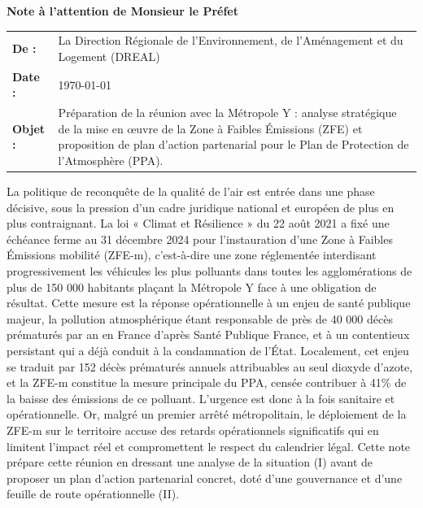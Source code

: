 \documentclass[12pt,a4paper]{article}
\begin{document}
\thispagestyle{firstpage}


\begin{center}
\textbf{\Large Note à l'attention de Monsieur le Préfet}\\
\end{center}

\vspace{0.5cm}

\begin{tabular}{@{}p{3cm}p{12cm}@{}}
\textbf{De :} & La Direction Régionale de l'Environnement, de l'Aménagement et du Logement (DREAL) \\
\textbf{Date :} & \today \\
\textbf{Objet :} & Préparation de la réunion avec la Métropole Y : analyse stratégique de la mise en œuvre de la Zone à Faibles Émissions (ZFE) et proposition de plan d'action partenarial pour le Plan de Protection de l'Atmosphère (PPA). \\
\end{tabular}

\vspace{1cm}

\indent La politique de reconquête de la qualité de l'air est entrée dans une phase décisive, sous la pression d'un cadre juridique national et européen de plus en plus contraignant. La loi « Climat et Résilience » du 22 août 2021 a fixé une échéance ferme au 31 décembre 2024 pour l'instauration d'une Zone à Faibles Émissions mobilité (ZFE-m), c’est-à-dire une zone réglementée interdisant progressivement les véhicules les plus polluants dans toutes les agglomérations de plus de 150 000 habitants plaçant la Métropole Y face à une obligation de résultat. Cette mesure est la réponse opérationnelle à un enjeu de santé publique majeur, la pollution atmosphérique étant responsable de près de 40 000 décès prématurés par an en France d'après Santé Publique France, et à un contentieux persistant qui a déjà conduit à la condamnation de l'État. Localement, cet enjeu se traduit par 152 décès prématurés annuels attribuables au seul dioxyde d'azote, et la ZFE-m constitue la mesure principale du PPA, censée contribuer à 41\% de la baisse des émissions de ce polluant. L'urgence est donc à la fois sanitaire et opérationnelle. Or, malgré un premier arrêté métropolitain, le déploiement de la ZFE-m sur le territoire accuse des retards opérationnels significatifs qui en limitent l'impact réel et compromettent le respect du calendrier légal.
Cette note prépare cette réunion en dressant une analyse de la situation (I) avant de proposer un plan d'action partenarial concret, doté d'une gouvernance et d'une feuille de route opérationnelle (II).
\end{document}
